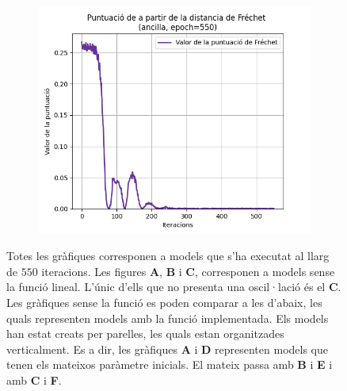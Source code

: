 \begin{figure}
\begin{subfigure}[b]{.32\linewidth}
		\includegraphics[width=\linewidth]{figures/data/FD_score_A3.png}
		\caption{}
	\end{subfigure}
\caption{Totes les gràfiques corresponen a models que s'ha executat al llarg de $550$ iteracions. Les figures \textbf{A}, \textbf{B} i \textbf{C}, corresponen a models sense la funció lineal. L'únic d'ells que no presenta una oscil·lació és el \textbf{C}. Les gràfiques sense la funció es poden comparar a les d'abaix, les quals representen models amb la funció implementada. Els models han estat creats per parelles, les quals estan organitzades verticalment. Es a dir, les gràfiques \textbf{A} i \textbf{D} representen models que tenen els mateixos paràmetre inicials. El mateix passa amb \textbf{B} i \textbf{E} i amb \textbf{C} i \textbf{F}.}
\label{fig:550_SD_score}
\end{figure}

